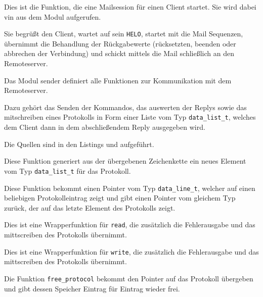 \label{fn:smtp_start_session}
Dies ist die Funktion, die eine Mailsession f\"{u}r einen Client startet. Sie wird dabei vin  aus dem Modul  aufgerufen.

Sie begr\"{u}ßt den Client, wartet auf sein \texttt{HELO}, startet mit  die Mail Sequenzen, \"{u}bernimmt die Behandlung der R\"{u}ckgabewerte (r\"{u}cksetzten, beenden oder abbrechen der Verbindung) und schickt mittels  die Mail schließlich an den Remoteserver.



\label{mod:sender}
Das Modul sender definiert alle Funktionen zur Kommunikation mit dem Remoteserver.

Dazu geh\"{o}rt das Senden der Kommandos, das auswerten der Replys sowie das mitschreiben eines Protokolls in Form einer Liste vom Typ \texttt{data\_list\_t}, welches dem Client dann in dem abschließendem Reply ausgegeben wird.

Die Quellen sind in den Listings  und  aufgef\"{u}hrt.

\label{fn:new_proto_entry}
Diese Funktion generiert aus der \"{u}bergebenen Zeichenkette ein neues Element vom Typ \texttt{data\_list\_t} f\"{u}r das Protokoll.

\label{fn:wind_proto}
Diese Funktion bekommt einen Pointer vom Typ \texttt{data\_line\_t}, welcher auf einen beliebigen Protokolleintrag zeigt und gibt einen Pointer vom gleichem Typ zur\"{u}ck, der auf das letzte Element des Protokolls zeigt.

\label{fn:read_remote}
Dies ist eine Wrapperfunktion f\"{u}r \texttt{read}, die zus\"{a}tzlich die Fehlerausgabe und das mittscreiben des Protokolls \"{u}bernimmt.

\label{fn:write_remote}
Dies ist eine Wrapperfunktion f\"{u}r \texttt{write}, die zus\"{a}tzlich die Fehlerausgabe und das mittscreiben des Protokolls \"{u}bernimmt.

\label{fn:free_protocol}
Die Funktion \texttt{free\_protocol} bekommt den Pointer auf das Protokoll \"{u}bergeben und gibt dessen Speicher Eintrag f\"{u}r Eintrag wieder frei.

